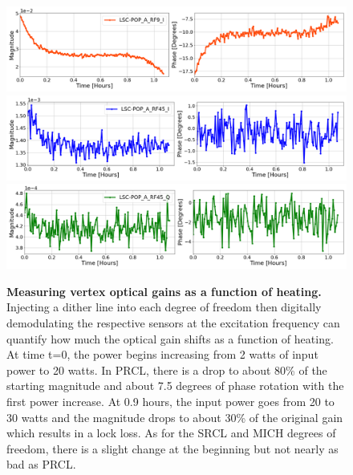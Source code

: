 \begin{figure}[ht]
	\centering
	\includegraphics[width=1.0 \textwidth]{../Figures/PRCL_EXC_LSC-POP_A_RF9_I.png}
	\includegraphics[width=1.0 \textwidth]{../Figures/SRCL_EXC_LSC-POP_A_RF45_I.png}
	\includegraphics[width=1.0 \textwidth]{../Figures/MICH_EXC_LSC-POP_A_RF45_Q.png}
	\caption[Measuring vertex optical gains as a function of heating.]  
	{\textbf{Measuring vertex optical gains as a function of heating.}
	Injecting a dither line into each degree of freedom then digitally demodulating the respective sensors at the excitation frequency can quantify how much the optical gain shifts as a function of heating. At time t=0, the power begins increasing from 2 watts of input power to 20 watts. In PRCL, there is a drop to about 80\% of the starting magnitude and about 7.5 degrees of phase rotation with the first power increase. At 0.9 hours, the input power goes from 20 to 30 watts and the magnitude drops to about 30\% of the original gain which results in a lock loss.  As for the SRCL and MICH degrees of freedom, there is a slight change at the beginning but not nearly as bad as PRCL.
	}
	\label{fig:POP18_POP90}
\end{figure}

